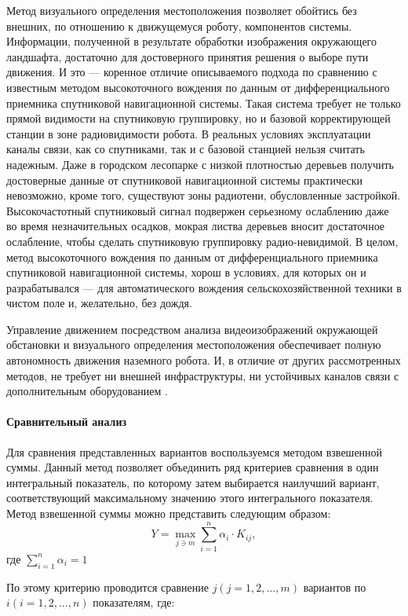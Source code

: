 Метод визуального определения местоположения позволяет обойтись без внешних, по отношению к движущемуся роботу, компонентов системы. Информации, полученной в результате обработки изображения окружающего ландшафта, достаточно для достоверного принятия решения о выборе пути движения. И это — коренное отличие описываемого подхода по сравнению с известным методом высокоточного вождения по данным от дифференциального приемника спутниковой навигационной системы. Такая система требует не только прямой видимости на спутниковую группировку, но и базовой корректирующей станции в зоне радиовидимости робота. В реальных условиях эксплуатации каналы связи, как со спутниками, так и с базовой станцией нельзя считать надежным. Даже в городском лесопарке с низкой плотностью деревьев получить достоверные данные от спутниковой навигационной системы практически невозможно, кроме того, существуют зоны радиотени, обусловленные застройкой. Высокочастотный спутниковый сигнал подвержен серьезному ослаблению даже во время незначительных осадков, мокрая листва деревьев вносит достаточное ослабление, чтобы сделать спутниковую группировку радио-невидимой. В целом, метод высокоточного вождения по данным от дифференциального приемника спутниковой навигационной системы, хорош в условиях, для которых он и разрабатывался — для автоматического вождения сельскохозяйственной техники в чистом поле и, желательно, без дождя.

Управление движением посредством анализа видеоизображений окружающей обстановки и визуального определения местоположения обеспечивает полную автономность движения наземного робота. И, в отличие от других рассмотренных методов, не требует ни внешней инфраструктуры, ни устойчивых каналов связи с дополнительным оборудованием \cite{spmrobotics}.


\paragraph{Сравнительный анализ}

Для сравнения представленных вариантов воспользуемся методом взвешенной суммы. Данный метод позволяет объединить ряд критериев сравнения в один интегральный показатель, по которому затем выбирается наилучший вариант, соответствующий максимальному значению этого интегрального показателя. Метод взвешенной суммы можно представить следующим образом: 
$$ Y = \max_{j \ni m} \displaystyle\sum_{i=1}^{n} \alpha_i \cdot K_{ij},$$
где $\sum_{i=1}^{n} \alpha_i = 1$

По этому критерию проводится сравнение $j (j = 1, 2, …, m)$ вариантов по $i (i = 1, 2, …, n)$ показателям, где:

